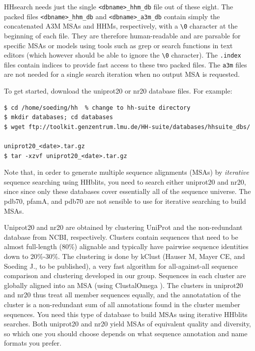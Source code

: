 \documentclass[11pt,a4paper]{article}
\begin{document}
HHsearch needs just the single \verb`<dbname>_hhm_db` file out of these eight. The packed files \verb`<dbname>_hhm_db` and \verb`<dbname>_a3m_db` contain simply the concatenated A3M MSAs and HHMs, respectively, with a \verb`\0` character at the beginning of each file. They are therefore human-readable and are parsable for specific MSAs or models using tools such as grep or search functions in text editors (which however should be able to ignore the \verb`\0` character). The \verb`.index` files contain indices to provide fast access to these two packed files. The \verb`a3m` files are not needed for a single search iteration when no output MSA is requested. 

To get started, download the uniprot20 or nr20 database files. For example:
\begin{verbatim}
$ cd /home/soeding/hh  % change to hh-suite directory
$ mkdir databases; cd databases
$ wget ftp://toolkit.genzentrum.lmu.de/HH-suite/databases/hhsuite_dbs/
                                                 uniprot20_<date>.tar.gz
$ tar -xzvf uniprot20_<date>.tar.gz
\end{verbatim}

Note that, in order to generate multiple sequence alignments (MSAs) by \emph{iterative} sequence searching using HHblits,
you need to search either uniprot20 and nr20, since since only these databases cover essentially all of the sequence 
universe. The pdb70, pfamA, and pdb70 are not sensible to use for iterative searching to build MSAs.

Uniprot20 and nr20 are obtained by clustering UniProt \cite{uniprot:2010} and the non-redundant database from NCBI, respectively. Clusters  contain sequences that need to be almost full-length (80\%) alignable and typically have pairwise sequence identities down to 20\%-30\%. The clustering is done by kClust (Hauser M, Mayer CE, and Soeding J., to be published), a very fast algorithm for all-against-all sequence comparison and clustering developed in our group. Sequences in each cluster are globally aligned into an MSA (using ClustalOmega \cite{Higgins:2011}). The clusters in uniprot20 and nr20 thus treat all member sequences equally, and the annotatation of the cluster is a non-redundant sum of all annotations found in the cluster member sequences. You need this type of database to build MSAs using iterative HHblits searches. Both uniprot20 and nr20 yield MSAs of equivalent quality and diversity, so which one you should choose depends on what sequence annotation and name formats you prefer. 
\end{document}
